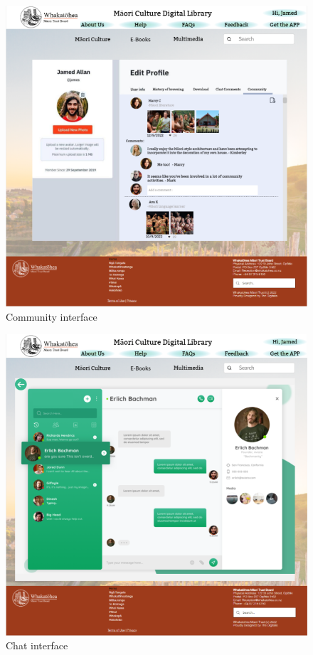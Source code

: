 \begin{figure}[htbp]
  \centerline{\includegraphics[width=400pt]{images/3-1-5.png}}
  \caption{Community interface}
  \label{fig3.1.3}
\end{figure}

\begin{figure}[htbp]
  \centerline{\includegraphics[width=400pt]{images/3-1-6.png}}
  \caption{Chat interface}
  \label{fig3.1.4}
\end{figure}

